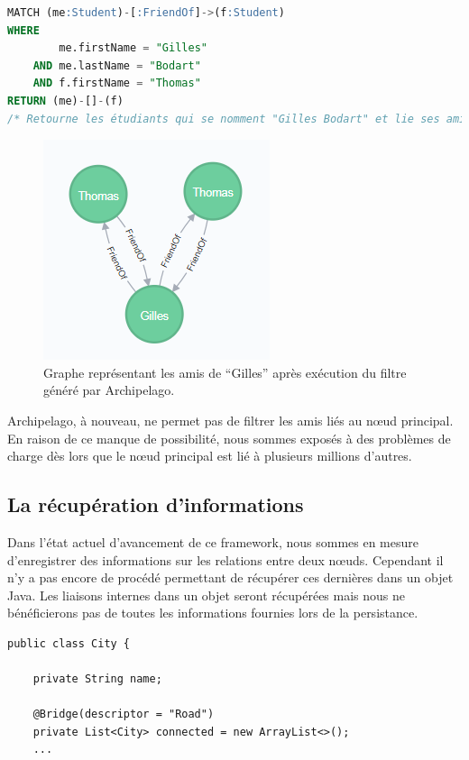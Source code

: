 \documentclass[a4paper,fleqn,12pt,oneside]{book}
\begin{document}
\begin{lstlisting}[language=SQL]
MATCH (me:Student)-[:FriendOf]->(f:Student)
WHERE
	    me.firstName = "Gilles"
	AND me.lastName = "Bodart"
	AND	f.firstName = "Thomas" 
RETURN (me)-[]-(f)
/* Retourne les étudiants qui se nomment "Gilles Bodart" et lie ses amis qui se prénomment "Thomas" ? */
\end{lstlisting} 

\begin{figure}[!ht]
\centering
\includegraphics[scale=1]{figures/friendOfFilt.png}
\caption{Graphe représentant les amis de \enquote{Gilles} après exécution du filtre généré par Archipelago.}
\label{fig:friendOfFilt}
\end{figure}

Archipelago, à nouveau, ne permet pas de filtrer les amis liés au nœud principal. En raison de ce manque de possibilité, nous sommes exposés à des problèmes de charge dès lors que le nœud principal est lié à plusieurs millions d'autres.

\subsection{La récupération d'informations}

Dans l'état actuel d'avancement de ce framework, nous sommes en mesure d'enregistrer des informations sur les relations entre deux nœuds. Cependant il n'y a pas encore de procédé permettant de récupérer ces dernières dans un objet Java. Les  liaisons internes dans un objet seront récupérées mais nous ne bénéficierons pas de toutes les informations fournies lors de la persistance.

\begin{lstlisting}
public class City {

    private String name;

    @Bridge(descriptor = "Road")
    private List<City> connected = new ArrayList<>();
	...
\end{lstlisting}
\end{document}
